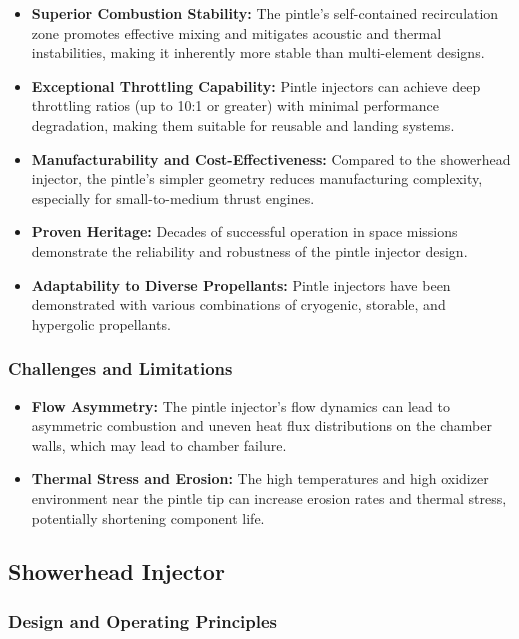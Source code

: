 \begin{itemize}
    \item \textbf{Superior Combustion Stability:} The pintle's self-contained recirculation zone promotes effective mixing and mitigates acoustic and thermal instabilities, making it inherently more stable than multi-element designs.
    \item \textbf{Exceptional Throttling Capability:} Pintle injectors can achieve deep throttling ratios (up to 10:1 or greater) with minimal performance degradation, making them suitable for reusable and landing systems.
    \item \textbf{Manufacturability and Cost-Effectiveness:} Compared to the showerhead injector, the pintle's simpler geometry reduces manufacturing complexity, especially for small-to-medium thrust engines.
    \item \textbf{Proven Heritage:} Decades of successful operation in space missions demonstrate the reliability and robustness of the pintle injector design.
    \item \textbf{Adaptability to Diverse Propellants:} Pintle injectors have been demonstrated with various combinations of cryogenic, storable, and hypergolic propellants.
\end{itemize}



\subsubsection{Challenges and Limitations}

\begin{itemize}
    \item \textbf{Flow Asymmetry:} The pintle injector’s flow dynamics can lead to asymmetric combustion and uneven heat flux distributions on the chamber walls, which may lead to chamber failure.
    \item \textbf{Thermal Stress and Erosion:} The high temperatures and high oxidizer environment near the pintle tip can increase erosion rates and thermal stress, potentially shortening component life.
\end{itemize}


\subsection{Showerhead Injector}

\subsubsection{Design and Operating Principles}

